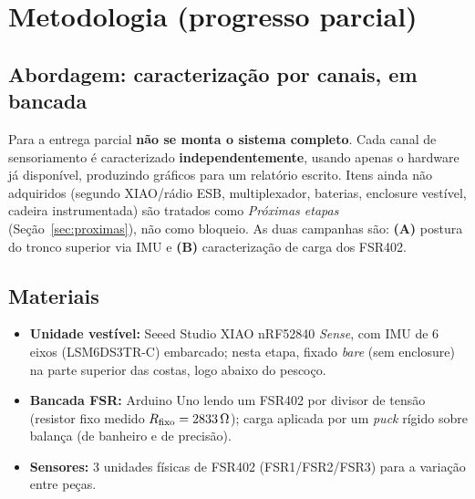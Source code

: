 \documentclass[12pt,a4paper]{article}
\begin{document}
\section{Metodologia (progresso parcial)}

\subsection{Abordagem: caracterização por canais, em bancada}
Para a entrega parcial \textbf{não se monta o sistema completo}. Cada canal de
sensoriamento é caracterizado \textbf{independentemente}, usando apenas o hardware
já disponível, produzindo gráficos para um relatório escrito. Itens ainda não
adquiridos (segundo XIAO/rádio ESB, multiplexador, baterias, enclosure vestível,
cadeira instrumentada) são tratados como \emph{Próximas etapas}
(Seção~\ref{sec:proximas}), não como bloqueio. As duas campanhas são:
\textbf{(A)} postura do tronco superior via IMU e \textbf{(B)} caracterização de
carga dos FSR402.

\subsection{Materiais}
\begin{itemize}[nosep]
  \item \textbf{Unidade vestível:} Seeed Studio XIAO nRF52840 \emph{Sense}, com IMU
        de 6 eixos (LSM6DS3TR-C) embarcado; nesta etapa, fixado \emph{bare} (sem
        enclosure) na parte superior das costas, logo abaixo do pescoço.
  \item \textbf{Bancada FSR:} Arduino Uno lendo um FSR402 por divisor de tensão
        (resistor fixo medido $R_{\text{fixo}} = 2833\,\ohm$); carga aplicada por um
        \emph{puck} rígido sobre balança (de banheiro e de precisão).
  \item \textbf{Sensores:} 3 unidades físicas de FSR402 (FSR1/FSR2/FSR3) para a
        variação entre peças.
\end{itemize}
\end{document}
